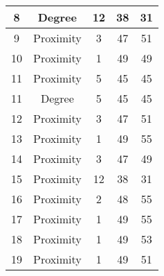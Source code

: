 \documentclass[results.tex]{subfiles}
\begin{document}
\begin{center}
\begin{tabular}{| c || c | c | c | c |}
            \hline
            8                       & Degree                       & 12                     & 38                      & 31                   \\
            \hline
            9                       & Proximity                    & 3                      & 47                      & 51                   \\
            \hline
            10                      & Proximity                    & 1                      & 49                      & 49                   \\
            \hline
            11                      & Proximity                    & 5                      & 45                      & 45                   \\
            \hline
            11                      & Degree                       & 5                      & 45                      & 45                   \\
            \hline
            12                      & Proximity                    & 3                      & 47                      & 51                   \\
            \hline
            13                      & Proximity                    & 1                      & 49                      & 55                   \\
            \hline
            14                      & Proximity                    & 3                      & 47                      & 49                   \\
            \hline
            15                      & Proximity                    & 12                     & 38                      & 31                   \\
            \hline
            16                      & Proximity                    & 2                      & 48                      & 55                   \\
            \hline
            17                      & Proximity                    & 1                      & 49                      & 55                   \\
            \hline
            18                      & Proximity                    & 1                      & 49                      & 53                   \\
            \hline
            19                      & Proximity                    & 1                      & 49                      & 51                   \\

\end{tabular}
\end{center}
\end{document}
